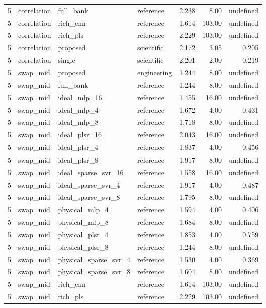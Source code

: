 \documentclass[10pt,a4paper]{article}
\begin{document}
\begin{landscape}
\begin{longtable}{llllrrr}
5 & correlation & full\_bank & reference & 2.238 & 8.00 & undefined \\
5 & correlation & rich\_cnn & reference & 1.614 & 103.00 & undefined \\
5 & correlation & rich\_pls & reference & 2.229 & 103.00 & undefined \\
5 & correlation & proposed & scientific & 2.172 & 3.05 & 0.205 \\
5 & correlation & single & scientific & 2.201 & 2.00 & 0.219 \\
5 & swap\_mid & proposed & engineering & 1.244 & 8.00 & undefined \\
5 & swap\_mid & full\_bank & reference & 1.244 & 8.00 & undefined \\
5 & swap\_mid & ideal\_mlp\_16 & reference & 1.455 & 16.00 & undefined \\
5 & swap\_mid & ideal\_mlp\_4 & reference & 1.672 & 4.00 & 0.431 \\
5 & swap\_mid & ideal\_mlp\_8 & reference & 1.718 & 8.00 & undefined \\
5 & swap\_mid & ideal\_plsr\_16 & reference & 2.043 & 16.00 & undefined \\
5 & swap\_mid & ideal\_plsr\_4 & reference & 1.837 & 4.00 & 0.456 \\
5 & swap\_mid & ideal\_plsr\_8 & reference & 1.917 & 8.00 & undefined \\
5 & swap\_mid & ideal\_sparse\_svr\_16 & reference & 1.558 & 16.00 & undefined \\
5 & swap\_mid & ideal\_sparse\_svr\_4 & reference & 1.917 & 4.00 & 0.487 \\
5 & swap\_mid & ideal\_sparse\_svr\_8 & reference & 1.795 & 8.00 & undefined \\
5 & swap\_mid & physical\_mlp\_4 & reference & 1.594 & 4.00 & 0.406 \\
5 & swap\_mid & physical\_mlp\_8 & reference & 1.684 & 8.00 & undefined \\
5 & swap\_mid & physical\_plsr\_4 & reference & 1.853 & 4.00 & 0.759 \\
5 & swap\_mid & physical\_plsr\_8 & reference & 1.244 & 8.00 & undefined \\
5 & swap\_mid & physical\_sparse\_svr\_4 & reference & 1.530 & 4.00 & 0.369 \\
5 & swap\_mid & physical\_sparse\_svr\_8 & reference & 1.604 & 8.00 & undefined \\
5 & swap\_mid & rich\_cnn & reference & 1.614 & 103.00 & undefined \\
5 & swap\_mid & rich\_pls & reference & 2.229 & 103.00 & undefined \\

\end{longtable}
\end{landscape}
\end{document}
